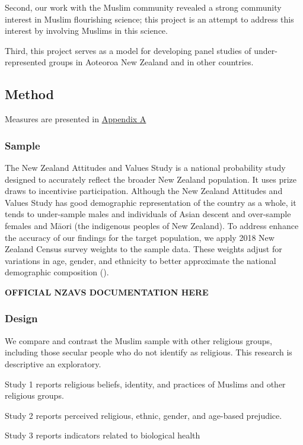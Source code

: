 \documentclass[
  single column]{article}
\begin{document}
Second, our work with the Muslim community revealed a strong community
interest in Muslim flourishing science; this project is an attempt to
address this interest by involving Muslims in this science.

Third, this project serves as a model for developing panel studies of
under-represented groups in Aoteoroa New Zealand and in other countries.

\subsection{Method}\label{method}

Measures are presented in \hyperref[appendix-a]{Appendix A}

\subsubsection{Sample}\label{sample}

The New Zealand Attitudes and Values Study is a national probability
study designed to accurately reflect the broader New Zealand population.
It uses prize draws to incentivise participation. Although the New
Zealand Attitudes and Values Study has good demographic representation
of the country as a whole, it tends to under-sample males and
individuals of Asian descent and over-sample females and Māori (the
indigenous peoples of New Zealand). To address enhance the accuracy of
our findings for the target population, we apply 2018 New Zealand Census
survey weights to the sample data. These weights adjust for variations
in age, gender, and ethnicity to better approximate the national
demographic composition ().

\textbf{OFFICIAL NZAVS DOCUMENTATION HERE}

\subsubsection{Design}\label{design}

We compare and contrast the Muslim sample with other religious groups,
including those secular people who do not identify as religious. This
research is descriptive an exploratory.

Study 1 reports religious beliefs, identity, and practices of Muslims
and other religious groups.

Study 2 reports perceived religious, ethnic, gender, and age-based
prejudice.

Study 3 reports indicators related to biological health
\end{document}
